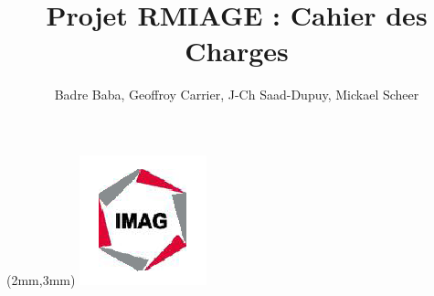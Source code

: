 \documentclass[10pt,a4paper]{article}
\title{Projet RMIAGE : Cahier des Charges}
\author{
	Badre Baba, Geoffroy Carrier, J-Ch Saad-Dupuy, Mickael Scheer
}
\begin{document}
\begin{center}
\begin{textblock*}{35cm}(2mm,3mm)
\includegraphics[scale=0.8]{imag_logo.png}
\end{textblock*}
\end{center}
 
\maketitle




\end{document}
